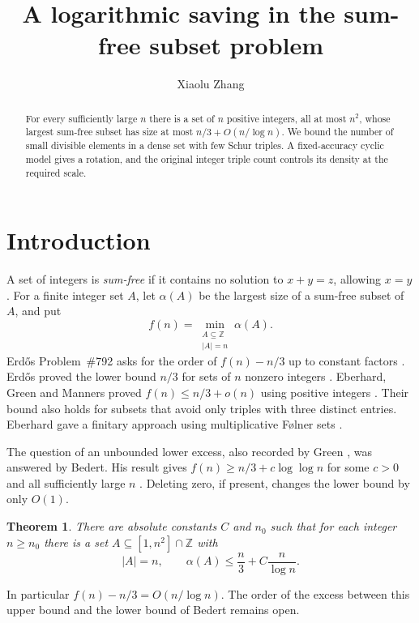 \documentclass[11pt,reqno]{amsart}
\title{A logarithmic saving in the sum-free subset problem}
\author{Xiaolu Zhang}
\newtheorem{theorem}{Theorem}[section]
\newcommand{\Z}{\mathbb Z}
\numberwithin{equation}{section}
\begin{document}
\begin{abstract}
For every sufficiently large \(n\) there is a set of \(n\) positive
integers, all at most \(n^2\), whose largest sum-free subset has size
at most \(n/3+O(n/\log n)\). We bound the number of small divisible
elements in a dense set with few Schur triples. A fixed-accuracy
cyclic model gives a rotation, and the original integer triple count
controls its density at the required scale.
\end{abstract}

\maketitle

\section{Introduction}\label{sec:intro}

A set of integers is \emph{sum-free} if it contains no solution to
\(x+y=z\), allowing \(x=y\). For a finite integer set \(A\), let
\(\alpha(A)\) be the largest size of a sum-free subset of \(A\), and put
\[
 f(n)=\min_{\substack{A\subseteq\Z\\|A|=n}}\alpha(A).
\]
Erd\H{o}s Problem~\#792 asks for the order of \(f(n)-n/3\) up to
constant factors \cite{bloom}. Erd\H{o}s proved the lower bound
\(n/3\) for sets of \(n\) nonzero integers \cite{erdos}.
Eberhard, Green and Manners proved \(f(n)\le n/3+o(n)\)
using positive integers \cite[Theorem~1.1]{egm}. Their bound also
holds for subsets that avoid only triples with three distinct entries.
Eberhard gave a finitary approach using multiplicative F{\o}lner
sets \cite{eberhard}.

The question of an unbounded lower excess, also recorded by Green
\cite[Problem~1]{green}, was answered by Bedert. His result gives
\(f(n)\ge n/3+c\log\log n\) for some \(c>0\) and all sufficiently
large \(n\) \cite[Theorem~1.2]{bedert}. Deleting zero, if present,
changes the lower bound by only \(O(1)\).

\begin{theorem}\label{thm:main}
There are absolute constants \(C\) and \(n_0\) such that for each
integer \(n\ge n_0\) there is a set \(A\subseteq[1,n^2]\cap\Z\) with
\[
 |A|=n,\qquad \alpha(A)\le \frac n3+C\frac{n}{\log n}.
\]
\end{theorem}

In particular \(f(n)-n/3=O(n/\log n)\). The order of the excess between
this upper bound and the lower bound of Bedert remains open.
\end{document}
